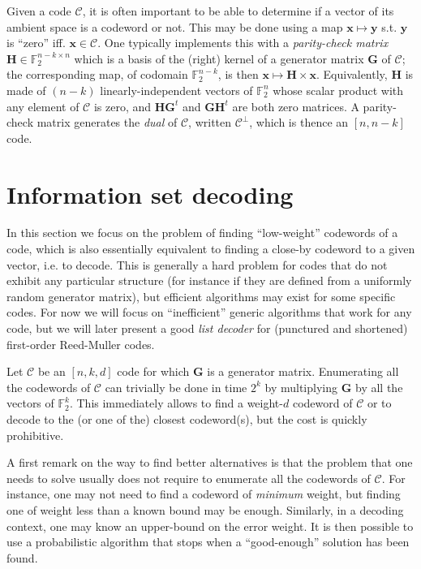 \documentclass[11pt,a4paper]{article}
\theoremstyle{definition}
\newcommand\ftwo{\mathbb{F}_{2}}
\newcommand\code{\mathcal{C}}
\begin{document}
\medskip

Given a code $\code$, it is often important to be able to determine if a vector of its ambient space is a codeword or not.
This may be done using a map $\bm{x} \mapsto \bm{y}$ s.t. $\bm{y}$ is ``zero'' iff. $\bm{x} \in \code$. One typically implements this with a \emph{parity-check matrix} $\bm{H} \in \ftwo^{n-k\times n}$
which is a basis of the (right) kernel of a generator matrix $\bm{G}$ of $\code$; the corresponding map, of codomain $\ftwo^{n-k}$, is then $\bm{x} \mapsto \bm{H}\times\bm{x}$. Equivalently, $\bm{H}$ is made of $(n-k)$ linearly-independent vectors of $\ftwo^n$ whose scalar product with any element of $\code$ is zero, and $\bm{H}\bm{G}^t$ and
$\bm{G}\bm{H}^t$ are both zero matrices. A parity-check matrix generates the \emph{dual} of $\code$, written $\code^\bot$, which is thence an $[n,n-k]$ code.

\section{Information set decoding}

In this section we focus on the problem of finding ``low-weight'' codewords of  a code, which is also essentially equivalent to finding a close-by codeword to a given vector, i.e. to decode.
This is generally a hard problem for codes that do not exhibit any particular structure (for instance if they are defined from a uniformly random generator matrix), but efficient algorithms may exist for some specific codes. For now we will focus on
``inefficient'' generic algorithms that work for any code, but we will later present a good \emph{list decoder} for (punctured and shortened) first-order Reed-Muller codes.

\smallskip

Let $\code$ be an $[n,k,d]$ code for which $\bm{G}$ is a generator matrix. Enumerating all the codewords of $\code$ can trivially be done in time $2^k$ by multiplying $\bm{G}$ by all the vectors of $\ftwo^k$. This immediately allows to find
a weight-$d$ codeword of $\code$ or to decode to the (or one of the) closest codeword(s),
but the cost is quickly prohibitive.

A first remark on the way to find better alternatives is that the problem that one needs to solve usually does not require to enumerate all the codewords of $\code$. For instance, one may not need to find a codeword of \emph{minimum} weight,
but finding one of weight less than a known bound may be enough. Similarly, in a decoding context, one may know an upper-bound on the error weight. It is then possible to use a probabilistic algorithm that stops when a ``good-enough''
solution has been found.
\end{document}
